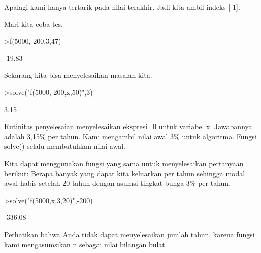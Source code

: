 \begin{eulernotebook}
\begin{eulercomment}
\begin{eulercomment}
\begin{eulercomment}
Apalagi kami hanya tertarik pada nilai terakhir. Jadi kita ambil
indeks [-1].


Mari kita coba tes.
\end{eulercomment}
\begin{eulerprompt}
>f(5000,-200,3,47)
\end{eulerprompt}
\begin{euleroutput}
       -19.83 
\end{euleroutput}
\begin{eulercomment}
Sekarang kita bisa menyelesaikan masalah kita.
\end{eulercomment}
\begin{eulerprompt}
>solve("f(5000,-200,x,50)",3)
\end{eulerprompt}
\begin{euleroutput}
         3.15 
\end{euleroutput}
\begin{eulercomment}
Rutinitas penyelesaian menyelesaikan ekspresi=0 untuk variabel x.
Jawabannya adalah 3,15\% per tahun. Kami mengambil nilai awal 3\% untuk
algoritma. Fungsi solve() selalu membutuhkan nilai awal.

Kita dapat menggunakan fungsi yang sama untuk menyelesaikan pertanyaan
berikut: Berapa banyak yang dapat kita keluarkan per tahun sehingga
modal awal habis setelah 20 tahun dengan asumsi tingkat bunga 3\% per
tahun.
\end{eulercomment}
\begin{eulerprompt}
>solve("f(5000,x,3,20)",-200)
\end{eulerprompt}
\begin{euleroutput}
      -336.08 
\end{euleroutput}
\begin{eulercomment}
Perhatikan bahwa Anda tidak dapat menyelesaikan jumlah tahun, karena
fungsi kami mengasumsikan n sebagai nilai bilangan bulat.\\


\end{eulercomment}
\end{eulercomment}
\end{eulercomment}
\end{eulernotebook}
